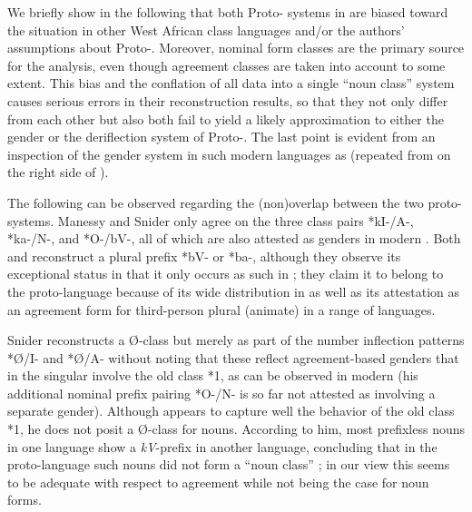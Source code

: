 \documentclass[output=collectionpaper]{langsci/langscibook}
\begin{document}
We briefly show in the following that both Proto- systems in  are biased toward the situation in other West African class languages and/or the authors' assumptions about Proto-. Moreover, nominal form classes are the primary source for the analysis, even though agreement classes are taken into account to some extent. This bias and the conflation of all data into a single ``noun class'' system causes serious errors in their reconstruction results, so that they not only differ from each other but also both fail to yield a likely approximation to either the gender or the deriflection system of Proto-. The last point is evident from an inspection of the gender system in such modern languages as  (repeated from  on the right side of ).

The following can be observed regarding the (non)overlap between the two proto-systems. Manessy and Snider only agree on the three class pairs *kI-/A-, *ka-/N-, and *O-/bV-, all of which are also attested as genders in modern . Both \citet[27]{Manessy1987} and \citet[141]{Snider1988} reconstruct a plural prefix *bV- or *ba-, although they observe its exceptional status in that it only occurs as such in ; they claim it to belong to the proto-language because of its wide distribution in  as well as its attestation as an agreement form for third-person plural (animate) in a range of  languages.

Snider reconstructs a Ø-class but merely as part of the number inflection patterns *Ø/I- and *Ø/A- without noting that these reflect agreement-based genders that in the singular involve the old  class *1, as can be observed in modern  (his additional nominal prefix pairing *O-/N- is so far not attested as involving a separate gender). Although \citet{Manessy1987} appears to capture well the behavior of the old  class *1, he does not posit a Ø-class for nouns. According to him, most prefixless nouns in one language show a \textit{kV}-prefix in another language, concluding that in the proto-language such nouns did not form a ``noun class'' \citep[20]{Manessy1987}; in our view this seems to be adequate with respect to agreement while not being the case for noun forms.
\end{document}

